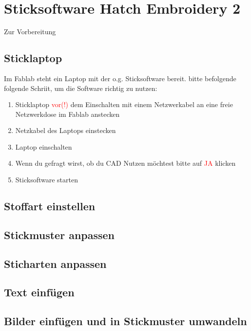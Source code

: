 \documentclass{\basedir/fablab-document}
\begin{document}
\section{Sticksoftware Hatch Embroidery 2}

Zur Vorbereitung 

\subsection{Sticklaptop}

	Im Fablab steht ein Laptop mit der o.g. Sticksoftware bereit. bitte befolgende folgende Schriit, um die Software richtig zu nutzen:

	\begin{enumerate}
		\item Sticklaptop \textcolor{red}{vor(!)} dem Einschalten mit einem Netzwerkabel an eine freie Netzwerkdose im Fablab anstecken
		\item Netzkabel des Laptops einstecken
		\item Laptop einschalten
		\item Wenn du gefragt wirst, ob du CAD Nutzen möchtest bitte auf \textcolor{red}{JA} klicken
		\item Sticksoftware starten
	\end{enumerate}

\subsection{Stoffart einstellen}

\subsection{Stickmuster anpassen}

\subsection{Sticharten anpassen}

\subsection{Text einfügen}

\subsection{Bilder einfügen und in Stickmuster umwandeln}

\pagebreak
\end{document}
